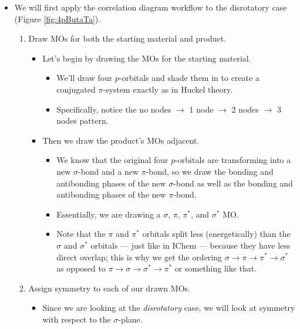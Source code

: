 \documentclass[../notes.tex]{subfiles}
\begin{document}
\begin{itemize}
\begin{figure}[h!]
    \end{figure}
    \begin{itemize}
        \item We will first apply the correlation diagram workflow to the disrotatory case (Figure \ref{fig:4pButaTa}).
        \begin{enumerate}
            \item Draw MOs for both the starting material and product.
            \begin{itemize}
                \item Let's begin by drawing the MOs for the starting material.
                \begin{itemize}
                    \item We'll draw four $p$-orbitals and shade them in to create a conjugated $\pi$-system exactly as in Huckel theory.
                    \item Specifically, notice the no nodes $\to$ 1 node $\to$ 2 nodes $\to$ 3 nodes pattern.
                \end{itemize}
                \item Then we draw the product's MOs adjacent.
                \begin{itemize}
                    \item We know that the original four $p$-orbitals are transforming into a new $\sigma$-bond and a new $\pi$-bond, so we draw the bonding and antibonding phases of the new $\sigma$-bond as well as the bonding and antibonding phases of the new $\pi$-bond.
                    \item Essentially, we are drawing a $\sigma$, $\pi$, $\pi^*$, and $\sigma^*$ MO.
                    \item Note that the $\pi$ and $\pi^*$ orbitals split less (energetically) than the $\sigma$ and $\sigma^*$ orbitals --- just like in IChem --- because they have less direct overlap; this is why we get the ordering $\sigma\to\pi\to\pi^*\to\sigma^*$ as opposed to $\pi\to\sigma\to\sigma^*\to\pi^*$ or something like that.
                \end{itemize}
            \end{itemize}
            \item Assign symmetry to each of our drawn MOs.
            \begin{itemize}
                \item Since we are looking at the \emph{disrotatory} case, we will look at symmetry with respect to the $\sigma$-plane.

\end{itemize}
\end{enumerate}
\end{itemize}
\end{itemize}
\end{document}
